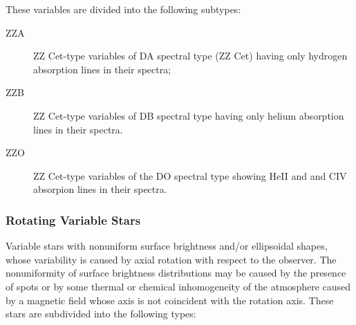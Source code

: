 \begin{description}
				These variables are divided into the following subtypes:
	\begin{description}
\item[ZZA]		ZZ Cet-type variables of DA spectral type (ZZ Cet) having
				only hydrogen absorption lines in their spectra;
\item[ZZB]		ZZ Cet-type variables of DB spectral type having only
				helium absorption lines in their spectra.
\item[ZZO]		ZZ Cet-type variables of the DO spectral type showing
                HeII and and CIV absorpion lines in their spectra.
	\end{description}
\end{description}

\subsubsection{Rotating Variable Stars}
\label{rotating-variable-stars}

Variable stars with nonuniform surface brightness and/or ellipsoidal
shapes, whose variability is caused by axial rotation with respect to
the observer. The nonuniformity of surface brightness distributions may
be caused by the presence of spots or by some thermal or chemical
inhomogeneity of the atmosphere caused by a magnetic field whose axis is
not coincident with the rotation axis. These stars are subdivided into
the following types:

